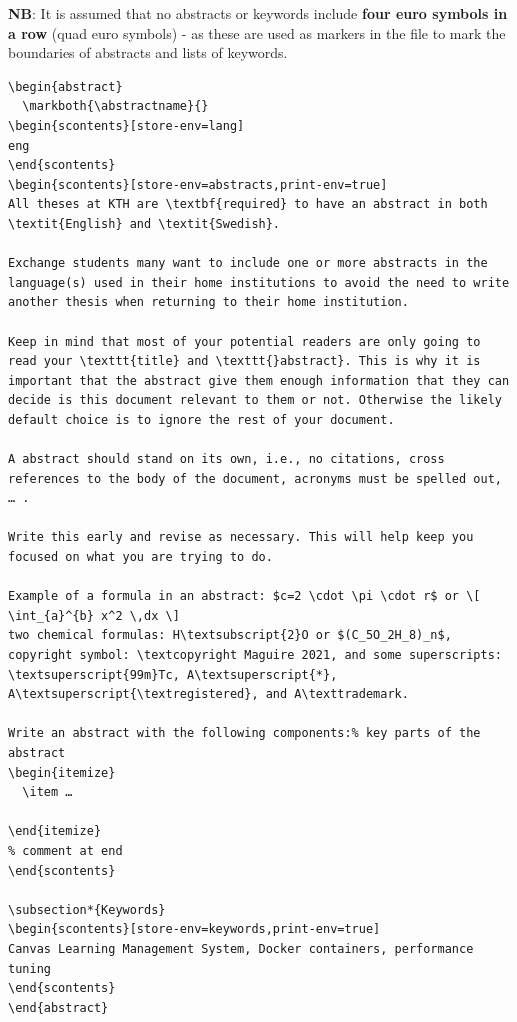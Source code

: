 \textbf{NB}: It is assumed that no abstracts or keywords include \textbf{four euro symbols in a row} (\ie quad euro symbols) - as these are used as markers in the file to mark the boundaries of abstracts and lists of keywords.
\begin{lstlisting}[language={[LaTeX]TeX}, caption={Storing the language in a scontents buffer named "lang"}, label=lst:EnglishAbstract]
\begin{abstract}
  \markboth{\abstractname}{}
\begin{scontents}[store-env=lang]
eng
\end{scontents}
\begin{scontents}[store-env=abstracts,print-env=true]
All theses at KTH are \textbf{required} to have an abstract in both \textit{English} and \textit{Swedish}.

Exchange students many want to include one or more abstracts in the language(s) used in their home institutions to avoid the need to write another thesis when returning to their home institution.

Keep in mind that most of your potential readers are only going to read your \texttt{title} and \texttt{}abstract}. This is why it is important that the abstract give them enough information that they can decide is this document relevant to them or not. Otherwise the likely default choice is to ignore the rest of your document.

A abstract should stand on its own, i.e., no citations, cross references to the body of the document, acronyms must be spelled out, … .

Write this early and revise as necessary. This will help keep you focused on what you are trying to do.

Example of a formula in an abstract: $c=2 \cdot \pi \cdot r$ or \[ \int_{a}^{b} x^2 \,dx \]
two chemical formulas: H\textsubscript{2}O or $(C_5O_2H_8)_n$, copyright symbol: \textcopyright Maguire 2021, and some superscripts: \textsuperscript{99m}Tc, A\textsuperscript{*},
A\textsuperscript{\textregistered}, and A\texttrademark.

Write an abstract with the following components:% key parts of the abstract
\begin{itemize}
  \item …

\end{itemize}
% comment at end
\end{scontents}

\subsection*{Keywords}
\begin{scontents}[store-env=keywords,print-env=true]
Canvas Learning Management System, Docker containers, performance tuning
\end{scontents}
\end{abstract}
\end{lstlisting}



